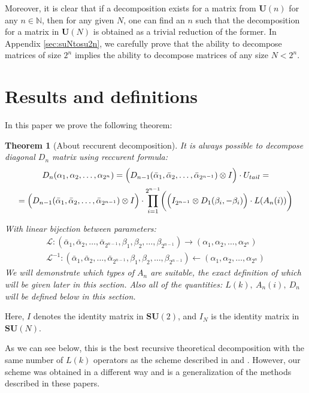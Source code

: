 \documentclass[a4paper, openany, 12pt]{article}
\newtheorem{theorem}{Theorem}
\theoremstyle{remark}
\theoremstyle{definition}
\newcommand{\ot}{\otimes}
\begin{document}
Moreover, it is clear that if a decomposition exists for a matrix from $\mathbf{U}(n)$ for any $n \in \mathbb{N}$, then for any given $N$, one can find an $n$ such that the decomposition for a matrix in $\mathbf{U}(N)$ is obtained as a trivial reduction of the former. In Appendix \ref{sec:suNtosu2n}, we carefully prove
 that the ability to decompose matrices of size $2^n$ implies the ability to decompose matrices of any size $N < 2^n$.

\section{Results and definitions}

In this paper we prove the following theorem:

\begin{theorem}[About reccurent decomposition\label{th:reccurent}]
It is always possible to decompose diagonal $D_n$ matrix using reccurent formula:
\begin{multline}
        D_{n}(\alpha_1, \alpha_2, \dots, \alpha_{2^n})=  \Bigl(D_{n-1}(\bar\alpha_1, \bar\alpha_2, \dots, \bar\alpha_{2^{n-1}}) \ot I\Bigr) \cdot U_{tail} =\\= \Bigl(D_{n-1}(\bar\alpha_1, \bar\alpha_2, \dots, \bar\alpha_{2^{n-1}}) \ot I\Bigr) \cdot \prod_{i=1}^{2^{n-1}} \biggl( \Bigl(I_{2^{n-1}} \ot D_1(\beta_i, -\beta_i)\Bigr) \cdot L(A_n(i)) \biggr)
    \label{eq:certralreccurentformula}
\end{multline}

With linear bijection between parameters:
\begin{align}
    \mathcal{L}: (\bar\alpha_1, \bar\alpha_2, \dots, \bar\alpha_{2^{n-1}},\beta_1,\beta_2,\dots,\beta_{2^{n-1}}) \rightarrow (\alpha_1, \alpha_2, \dots, \alpha_{2^n}) \\
    \mathcal{L}^{-1}: (\bar\alpha_1, \bar\alpha_2, \dots, \bar\alpha_{2^{n-1}},\beta_1,\beta_2,\dots,\beta_{2^{n-1}}) \leftarrow (\alpha_1, \alpha_2, \dots, \alpha_{2^n})
\end{align}
We will demonstrate which types of $A_n$ are suitable, the exact definition of which will be given later in this section.
Also all of the quantities: $L(k),\ A_n(i),\ D_n$ will be defined below in this section.
\end{theorem}
Here, $I$ denotes the identity matrix in $\mathbf{SU}(2)$, and $I_N$ is the identity matrix in $\mathbf{SU}(N)$.

As we can see below, this is the best recursive theoretical decomposition with the same number of $L(k)$ operators as the scheme described in \cite{1629135} and \cite{crooks2024}. However, our scheme was obtained in a different way and is a generalization of the methods described in these papers.
\end{document}
